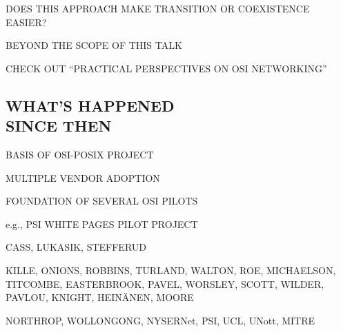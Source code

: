 

\begin{bwslide}

\begin{nrtc}
\item	DOES THIS APPROACH MAKE TRANSITION OR COEXISTENCE EASIER?

\item	BEYOND THE SCOPE OF THIS TALK
    \begin{nrtc}
    \item	CHECK OUT ``PRACTICAL PERSPECTIVES ON OSI NETWORKING''
    \end{nrtc}
\end{nrtc}
\end{bwslide}


\begin{bwslide}
\part*	{WHAT'S HAPPENED\\ SINCE THEN}\bf

\begin{nrtc}
\item	BASIS OF OSI-POSIX PROJECT

\item	MULTIPLE VENDOR ADOPTION

\item	FOUNDATION OF SEVERAL OSI PILOTS
    \begin{nrtc}
    \item	e.g., PSI WHITE PAGES PILOT PROJECT
    \end{nrtc}
\end{nrtc}
\end{bwslide}


\begin{bwslide}

\begin{nrtc}
\item	CASS, LUKASIK, STEFFERUD

\item	KILLE, ONIONS, ROBBINS, TURLAND, WALTON, ROE, MICHAELSON, TITCOMBE,
	EASTERBROOK, PAVEL, WORSLEY, SCOTT, WILDER, PAVLOU, KNIGHT,
	HEIN\"{A}NEN, MOORE

\item	NORTHROP, WOLLONGONG, NYSERNet, PSI, UCL, UNott, MITRE
\end{nrtc}
\end{bwslide}


